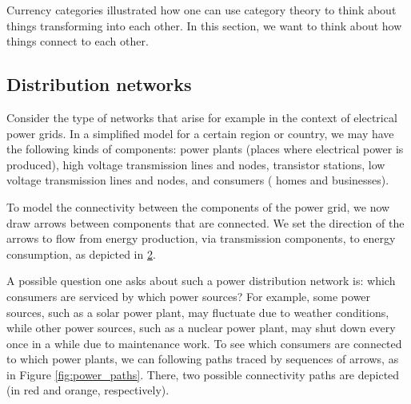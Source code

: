 
Currency categories illustrated how one can use category theory to think about things transforming into each other. In this section, we want to think about how things connect to each other.

\subsection{Distribution networks}

Consider the type of networks that arise for example in the context of electrical power grids. In a simplified model for a certain region or country, we may have the following kinds of components: power plants (places where electrical power is produced), high voltage transmission lines and nodes, transistor stations, low voltage transmission lines and nodes, and consumers ( homes and businesses). 

\begin{figure}[h!]
\centering
 \caption{}
\label{fig:power_nodes}
\end{figure}
To model the connectivity between the components of the power grid, we now draw arrows between components that are connected. We set the direction of the arrows to flow from energy production, via transmission components, to energy consumption, as depicted in \cref{fig:power_nodes_connected}. 
\begin{figure}[h!]
\centering
{}
 \caption{}
\label{fig:power_nodes_connected}
\end{figure}


A possible question one asks about such a power distribution network is: which consumers are serviced by which power sources? For example, some power sources, such as a solar power plant, may fluctuate due to weather conditions, while other power sources, such as a nuclear power plant, may shut down every once in a while due to maintenance work. To see which consumers are connected to which power plants, we can following paths traced by sequences of arrows, as in Figure \cref{fig:power_paths}. There, two possible connectivity paths are depicted (in red and orange, respectively).


